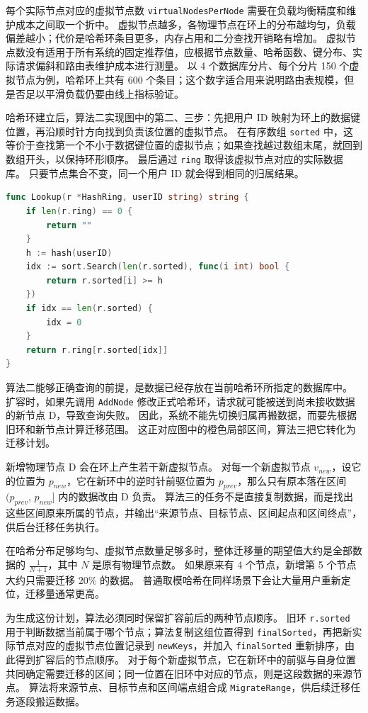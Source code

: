 每个实际节点对应的虚拟节点数 \texttt{virtualNodesPerNode} 需要在负载均衡精度和维护成本之间取一个折中。
虚拟节点越多，各物理节点在环上的分布越均匀，负载偏差越小；代价是哈希环条目更多，内存占用和二分查找开销略有增加。
虚拟节点数没有适用于所有系统的固定推荐值，应根据节点数量、哈希函数、键分布、实际请求偏斜和路由表维护成本进行测量。
以 4 个数据库分片、每个分片 150 个虚拟节点为例，哈希环上共有 600 个条目；这个数字适合用来说明路由表规模，但是否足以平滑负载仍要由线上指标验证。

哈希环建立后，算法二实现图中的第二、三步：先把用户 ID 映射为环上的数据键位置，再沿顺时针方向找到负责该位置的虚拟节点。
在有序数组 \texttt{sorted} 中，这等价于查找第一个不小于数据键位置的虚拟节点；如果查找越过数组末尾，就回到数组开头，以保持环形顺序。
最后通过 \texttt{ring} 取得该虚拟节点对应的实际数据库。
只要节点集合不变，同一个用户 ID 就会得到相同的归属结果。

\begin{tcolorbox}[title=算法二：根据哈希环查询对象归属]
\begin{lstlisting}[style=codeblock, language=go]
func Lookup(r *HashRing, userID string) string {
    if len(r.ring) == 0 {
        return ""
    }
    h := hash(userID)
    idx := sort.Search(len(r.sorted), func(i int) bool {
        return r.sorted[i] >= h
    })
    if idx == len(r.sorted) {
        idx = 0
    }
    return r.ring[r.sorted[idx]]
}
\end{lstlisting}
\end{tcolorbox}

算法二能够正确查询的前提，是数据已经存放在当前哈希环所指定的数据库中。
扩容时，如果先调用 \texttt{AddNode} 修改正式哈希环，请求就可能被送到尚未接收数据的新节点 D，导致查询失败。
因此，系统不能先切换归属再搬数据，而要先根据旧环和新节点计算迁移范围。
这正对应图中的橙色局部区间，算法三把它转化为迁移计划。

新增物理节点 D 会在环上产生若干新虚拟节点。
对每一个新虚拟节点 $v_{new}$，设它的位置为 $p_{new}$，它在新环中的逆时针前驱位置为 $p_{prev}$，那么只有原本落在区间 $(p_{prev},\, p_{new}]$ 内的数据改由 D 负责。
算法三的任务不是直接复制数据，而是找出这些区间原来所属的节点，并输出“来源节点、目标节点、区间起点和区间终点”，供后台迁移任务执行。

在哈希分布足够均匀、虚拟节点数量足够多时，整体迁移量的期望值大约是全部数据的 $\frac{1}{N+1}$，其中 $N$ 是原有物理节点数。
如果原来有 4 个节点，新增第 5 个节点大约只需要迁移 $20\%$ 的数据。
普通取模哈希在同样场景下会让大量用户重新定位，迁移量通常更高。

为生成这份计划，算法必须同时保留扩容前后的两种节点顺序。
旧环 \texttt{r.sorted} 用于判断数据当前属于哪个节点；算法复制这组位置得到 \texttt{finalSorted}，再把新实际节点对应的虚拟节点位置记录到 \texttt{newKeys}，并加入 \texttt{finalSorted} 重新排序，由此得到扩容后的节点顺序。
对于每个新虚拟节点，它在新环中的前驱与自身位置共同确定需要迁移的区间；同一位置在旧环中对应的节点，则是这段数据的来源节点。
算法将来源节点、目标节点和区间端点组合成 \texttt{MigrateRange}，供后续迁移任务逐段搬运数据。

